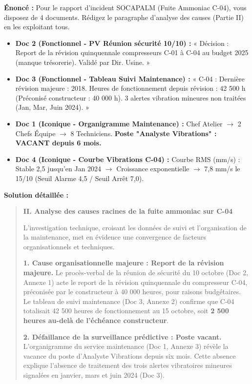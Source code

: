 \documentclass[11pt]{article}
\begin{document}
\begin{exoresolu}
    \textbf{Énoncé :} Pour le rapport d'incident SOCAPALM (Fuite Ammoniac C-04), vous disposez de 4 documents. Rédigez le paragraphe d'analyse des causes (Partie II) en les exploitant tous.
    \begin{itemize}
        \item \textbf{Doc 2 (Fonctionnel - PV Réunion sécurité 10/10) :} « Décision : Report de la révision quinquennale compresseurs C-01 à C-04 au budget 2025 (manque trésorerie). Validé par Dir. Usine. »
        \item \textbf{Doc 3 (Fonctionnel - Tableau Suivi Maintenance) :} « C-04 : Dernière révision majeure : 2018. Heures de fonctionnement depuis révision : 42 500 h (Préconisé constructeur : 40 000 h). 3 alertes vibration mineures non traitées (Jan, Mar, Juin 2024). »
        \item \textbf{Doc 1 (Iconique - Organigramme Maintenance) :} Chef Atelier $\rightarrow$ 2 Chefs Équipe $\rightarrow$ 8 Techniciens. \textbf{Poste "Analyste Vibrations" : VACANT depuis 6 mois.}
        \item \textbf{Doc 4 (Iconique - Courbe Vibrations C-04) :} Courbe RMS (mm/s) : Stable 2,5 jusqu'en Jan 2024 $\rightarrow$ Croissance exponentielle $\rightarrow$ 7,8 mm/s le 15/10 (Seuil Alarme 4,5 / Seuil Arrêt 7,0).
    \end{itemize}
    \tcblower
    \textbf{Solution détaillée :}
    \begin{quote}
        \textbf{II. Analyse des causes racines de la fuite ammoniac sur C-04}
        
        L'investigation technique, croisant les données de suivi et l'organisation de la maintenance, met en évidence une convergence de facteurs organisationnels et techniques.
        
        \textbf{1. Cause organisationnelle majeure : Report de la révision majeure.} Le procès-verbal de la réunion de sécurité du 10 octobre (Doc 2, Annexe 1) acte le report de la révision quinquennale du compresseur C-04, préconisée par le constructeur à 40 000 heures, pour raisons budgétaires. Le tableau de suivi maintenance (Doc 3, Annexe 2) confirme que C-04 totalisait 42 500 heures de fonctionnement au 15 octobre, soit \textbf{2 500 heures au-delà de l'échéance constructeur}.
        
        \textbf{2. Défaillance de la surveillance prédictive : Poste vacant.} L'organigramme du service maintenance (Doc 1, Annexe 3) révèle la vacance du poste d'Analyste Vibrations depuis six mois. Cette absence explique l'absence de traitement des trois alertes vibratoires mineures signalées en janvier, mars et juin 2024 (Doc 3).
        

\end{quote}
\end{exoresolu}
\end{document}
